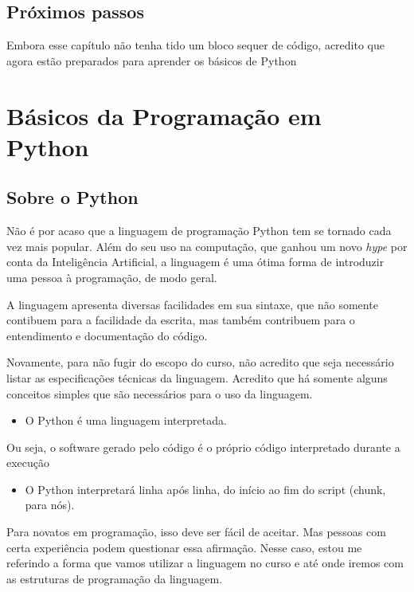 \documentclass[a4paper, 11pt, brazilian]{article}
\providecommand{\tightlist}{%
      \setlength{\itemsep}{0pt}\setlength{\parskip}{0pt}}
\begin{document}
    \hypertarget{pruxf3ximos-passos}{%
\subsection{Próximos passos}\label{pruxf3ximos-passos}}

Embora esse capítulo não tenha tido um bloco sequer de código, acredito
que agora estão preparados para aprender os básicos de Python

    \hypertarget{buxe1sicos-da-programauxe7uxe3o-em-python}{%
\section{Básicos da Programação em
Python}\label{buxe1sicos-da-programauxe7uxe3o-em-python}}

\hypertarget{sobre-o-python}{%
\subsection{Sobre o Python}\label{sobre-o-python}}

Não é por acaso que a linguagem de programação Python tem se tornado
cada vez mais popular. Além do seu uso na computação, que ganhou um novo
\emph{hype} por conta da Inteligência Artificial, a linguagem é uma
ótima forma de introduzir uma pessoa à programação, de modo geral.

A linguagem apresenta diversas facilidades em sua sintaxe, que não
somente contibuem para a facilidade da escrita, mas também contribuem
para o entendimento e documentação do código.

Novamente, para não fugir do escopo do curso, não acredito que seja
necessário listar as especificações técnicas da linguagem. Acredito que
há somente alguns conceitos simples que são necessários para o uso da
linguagem.

\begin{itemize}
\tightlist
\item
  O Python é uma linguagem interpretada.
\end{itemize}

Ou seja, o software gerado pelo código é o próprio código interpretado
durante a execução

\begin{itemize}
\tightlist
\item
  O Python interpretará linha após linha, do início ao fim do script
  (chunk, para nós).
\end{itemize}

Para novatos em programação, isso deve ser fácil de aceitar. Mas pessoas
com certa experiência podem questionar essa afirmação. Nesse caso, estou
me referindo a forma que vamos utilizar a linguagem no curso e até onde
iremos com as estruturas de programação da linguagem.
\end{document}
